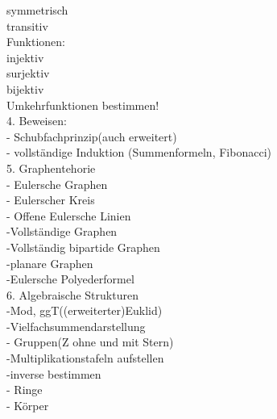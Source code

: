 \documentclass{article}
\begin{document}
	symmetrisch \\
	
	transitiv \\
	
	Funktionen: \\
	
	injektiv \\
	
	surjektiv \\
	
	bijektiv \\
	
	Umkehrfunktionen bestimmen! \\
	4. Beweisen: \\
	- Schubfachprinzip(auch erweitert) \\
	- vollständige Induktion  (Summenformeln, Fibonacci) \\
	
	5. Graphentehorie     \\
	
	- Eulersche Graphen \\
	
	- Eulerscher Kreis \\
	
	- Offene Eulersche Linien \\
	
	-Vollständige Graphen \\
	
	-Vollständig bipartide Graphen \\
	
	-planare Graphen \\
	
	-Eulersche Polyederformel \\
	6. Algebraische Strukturen \\
	
	-Mod, ggT((erweiterter)Euklid) \\
	
	-Vielfachsummendarstellung \\
	
	- Gruppen(Z ohne und mit Stern) \\
	
	-Multiplikationstafeln aufstellen \\
	
	-inverse bestimmen \\
	
	- Ringe \\
	
	- Körper \\
	
\end{document}
